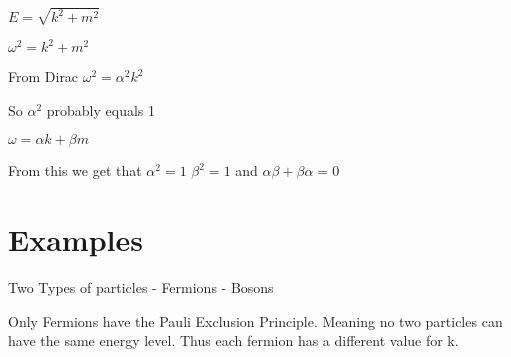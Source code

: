 \documentclass{article}
\begin{document}
$ E = \sqrt{k^2 + m^2} $

$ \omega^2 = k^2 + m^2 $

From Dirac
$ \omega^2 = \alpha^2 k^2$

So $\alpha^2$ probably equals 1

$\omega = \alpha k + \beta m$

From this we get that $\alpha^2 = 1$ $\beta^2 = 1$ and $\alpha \beta + \beta \alpha = 0$



\section{Examples}

Two Types of particles
- Fermions
- Bosons

Only Fermions have the Pauli Exclusion Principle. Meaning no two particles can have the same energy level. Thus each fermion has a different value for k.
\end{document}
